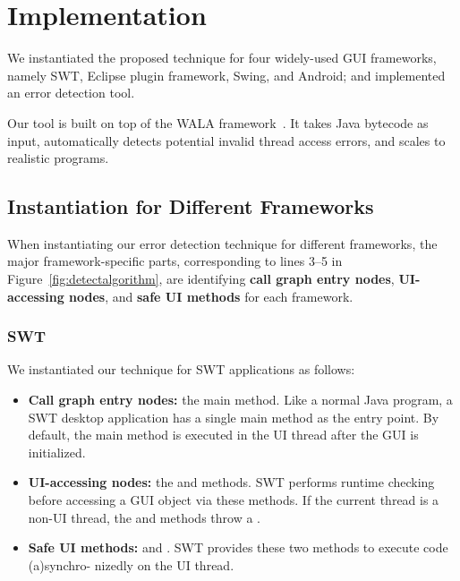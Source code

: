 
\tinystep
\tinystep
\section{Implementation}
\label{sec:implementation}

We instantiated the proposed technique for four widely-used
GUI frameworks, namely SWT, Eclipse plugin framework, Swing, and Android;
and implemented an error detection tool.

Our tool is built on top of the WALA framework~\cite{walatutorial}.
It takes Java bytecode as input, 
automatically detects potential invalid thread access
errors, and scales to realistic programs.  

\tinystep


\subsection{Instantiation for Different Frameworks}
\label{sec:platforms}

When instantiating our error detection technique for different
frameworks, the major framework-specific parts, corresponding to
lines 3--5 in Figure~\ref{fig:detectalgorithm}, are identifying
\textbf{call graph entry nodes}, \textbf{UI-accessing nodes},
and \textbf{safe UI methods} for each framework.

\tinystep
\subsubsection{SWT}

 We instantiated our technique for SWT applications as follows:

\begin{itemize}
\smallstep

\item \textbf{Call graph entry nodes:}  the main method. Like a normal Java program,
a SWT desktop application has a single main method as the entry point. By default,
the main method is executed in the UI thread after the GUI
is initialized.

\smallstep

\item \textbf{UI-accessing nodes:}  the 
and \discretionary{}{}{}\discretionary{}{}{} methods. SWT performs
runtime checking before accessing a GUI object via these methods.
If the current thread is a non-UI thread, the 
and  methods throw a .

\smallstep

\item \textbf{Safe UI methods:}  
and . SWT provides these two methods
to execute code (a)synchro- nizedly on the UI thread.

\end{itemize}

